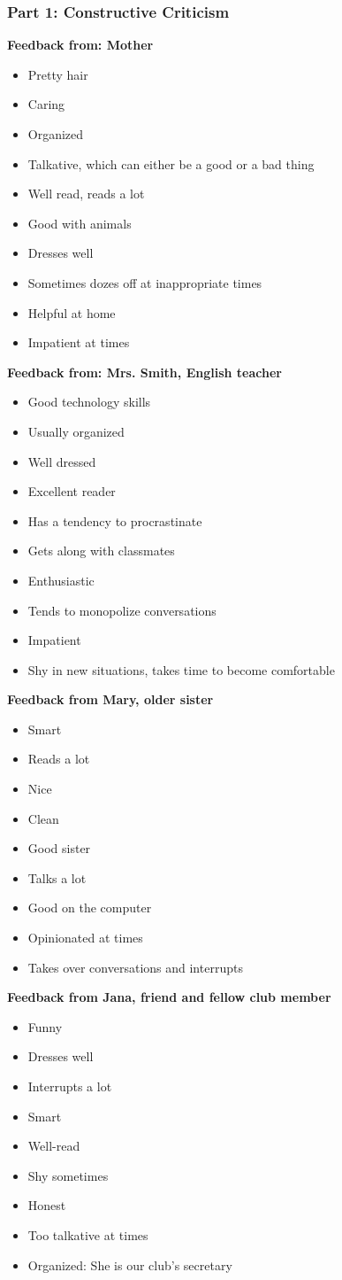 \subsubsection*{Part 1: Constructive Criticism}
\textbf{Feedback from: Mother}
\begin{itemize}[leftmargin=*]
\item Pretty hair
\item Caring
\item Organized
\item Talkative, which can either be a good or a bad thing
\item Well read, reads a lot
\item Good with animals
\item Dresses well
\item Sometimes dozes off at inappropriate times
\item Helpful at home
\item Impatient at times
\end{itemize}
\textbf{Feedback from: Mrs. Smith, English teacher}
\begin{itemize}[leftmargin=*]
\item Good technology skills
\item Usually organized
\item Well dressed
\item Excellent reader
\item Has a tendency to procrastinate
\item Gets along with classmates
\item Enthusiastic
\item Tends to monopolize conversations
\item Impatient
\item Shy in new situations, takes time to become comfortable
\end{itemize}
\textbf{Feedback from Mary, older sister}
\begin{itemize}[leftmargin=*]
\item Smart
\item Reads a lot
\item Nice
\item Clean
\item Good sister
\item Talks a lot
\item Good on the computer
\item Opinionated at times
\item Takes over conversations and interrupts
\end{itemize}
\textbf{Feedback from Jana, friend and fellow club member}
\begin{itemize}[leftmargin=*]
\item Funny
\item Dresses well
\item Interrupts a lot
\item Smart
\item Well-read
\item Shy sometimes
\item Honest
\item Too talkative at times
\item Organized: She is our club's secretary
\end{itemize}
